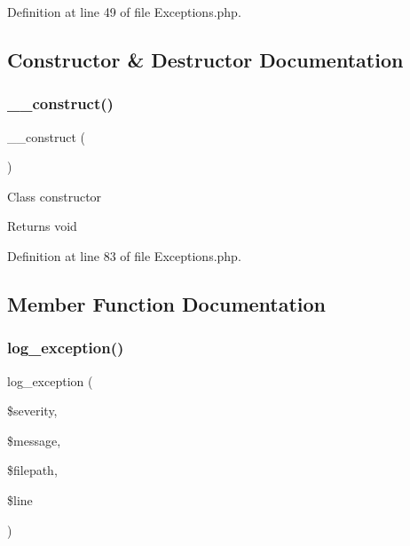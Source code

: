 Definition at line 49 of file Exceptions.\+php.



\subsection{Constructor \& Destructor Documentation}
\mbox{\label{class_c_i___exceptions_a095c5d389db211932136b53f25f39685}} 
\subsubsection{\texorpdfstring{\_\_construct()}{\_\_construct()}}
{\footnotesize\ttfamily \+\_\+\+\_\+construct (\begin{DoxyParamCaption}{ }\end{DoxyParamCaption})}

Class constructor

\begin{DoxyReturn}{Returns}
void 
\end{DoxyReturn}


Definition at line 83 of file Exceptions.\+php.



\subsection{Member Function Documentation}
\mbox{\label{class_c_i___exceptions_a477bd3360509887aeb6e0a56bcdcad2a}} 
\subsubsection{\texorpdfstring{log\_exception()}{log\_exception()}}
{\footnotesize\ttfamily log\+\_\+exception (\begin{DoxyParamCaption}\item[{}]{\$severity,  }\item[{}]{\$message,  }\item[{}]{\$filepath,  }\item[{}]{\$line }\end{DoxyParamCaption})}

